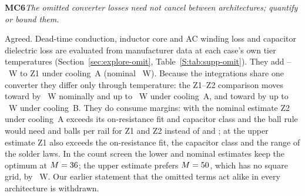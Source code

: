 \documentclass[10pt]{article}
\newcommand{\rc}[2]{\par\medskip\noindent\textbf{#1}\enspace\emph{#2}\par\smallskip\noindent}
\begin{document}
\rc{MC6}{The omitted converter losses need not cancel between architectures; quantify or bound
them.}
Agreed. Dead-time conduction, inductor core and AC winding loss and capacitor dielectric loss are
evaluated from manufacturer data at each case's own tier temperatures (Section~\ref{sec:explore-omit},
Table~\ref{S:tab:supp-omit}). They add \WrOmitLo--\WrOmitHi~W to Z1 under cooling~A (nominal
\WrOmitNom~W). Because the integrations share one converter they differ only through temperature: the
Z1--Z2 comparison moves toward \WrOmitFavorA{} by \WrOmitGapA~W nominally and up to \WrOmitGapAHi~W
under cooling~A, and toward \WrOmitFavorB{} by up to \WrOmitGapBHi~W under cooling~B. They do consume
margins: with the nominal estimate Z2 under cooling~A exceeds its on-resistance fit and capacitor
class and the ball rule would need \OmitNomBgaNZone{} and \OmitNomBgaNZtwo{} balls per rail for Z1
and Z2 instead of \BgaNadoptZone{} and \BgaNadoptZtwo; at the upper estimate Z1 also exceeds the
on-resistance fit, the capacitor class and the range of the solder laws. In the count screen the lower and nominal estimates keep the optimum at
$M = 36$; the upper estimate prefers $M = 50$, which has no square grid, by
\WrOmitDseMarginHi~W. Our earlier statement that the omitted terms act alike in every architecture is
withdrawn.
\end{document}
